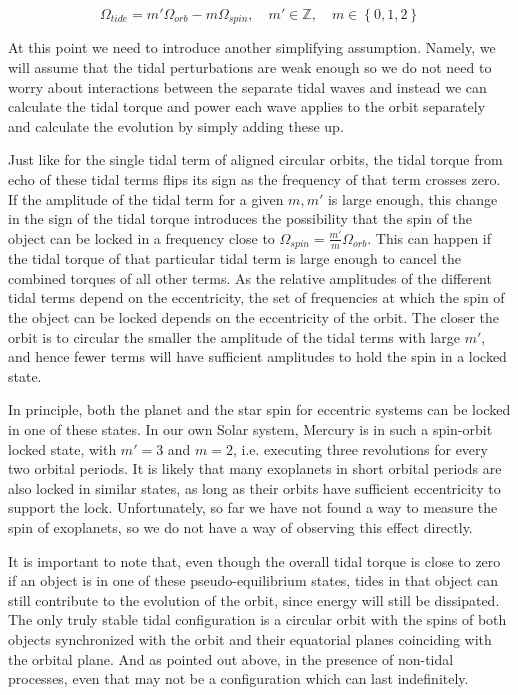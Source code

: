 \begin{equation}
%
    \Omega_{tide} = m' \Omega_{orb} - m \Omega_{spin},
%
    \quad m' \in \mathbb{Z},\quad m \in \left\{0, 1, 2\right\}
%
\end{equation}

At this point we need to introduce another simplifying assumption. Namely, we
will assume that the tidal perturbations are weak enough so we do not need to
worry about interactions between the separate tidal waves and instead we can
calculate the tidal torque and power each wave applies to the orbit separately
and calculate the evolution by simply adding these up.

Just like for the single tidal term of aligned circular orbits, the tidal torque
from echo of these tidal terms flips its sign as the frequency of that term
crosses zero. If the amplitude of the tidal term for a given $m,m'$ is large
enough, this change in the sign of the tidal torque introduces the possibility
that the spin of the object can be locked in a frequency close to
$\Omega_{spin}=\frac{m'}{m} \Omega_{orb}$. This can happen if the tidal torque
of that particular tidal term is large enough to cancel the combined torques of
all other terms. As the relative amplitudes of the different tidal terms depend
on the eccentricity, the set of frequencies at which the spin of the object can
be locked depends on the eccentricity of the orbit. The closer the orbit is to
circular the smaller the amplitude of the tidal terms with large $m'$, and hence
fewer terms will have sufficient amplitudes to hold the spin in a locked state.

In principle, both the planet and the star spin for eccentric systems can be
locked in one of these states. In our own Solar system, Mercury is in such a
spin-orbit locked state, with $m'=3$ and $m=2$, i.e. executing three revolutions
for every two orbital periods. It is likely that many exoplanets in short
orbital periods are also locked in similar states, as long as their orbits have
sufficient eccentricity to support the lock. Unfortunately, so far we have not
found a way to measure the spin of exoplanets, so we do not have a way of
observing this effect directly.

It is important to note that, even though the overall tidal torque is close to
zero if an object is in one of these pseudo-equilibrium states, tides in that
object can still contribute to the evolution of the orbit, since energy will
still be dissipated. The only truly stable tidal configuration is a circular
orbit with the spins of both objects synchronized with the orbit and their
equatorial planes coinciding with the orbital plane. And as pointed out above,
in the presence of non-tidal processes, even that may not be a configuration
which can last indefinitely.
